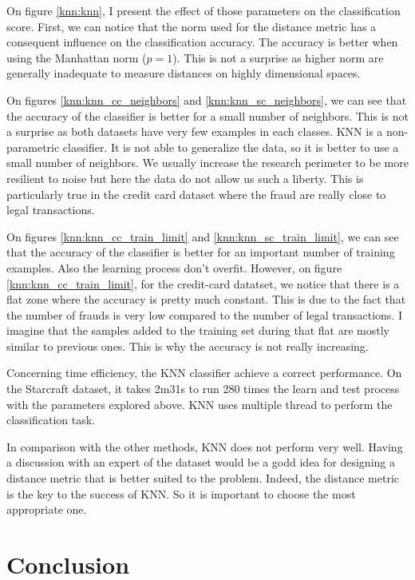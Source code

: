 \documentclass[10pt]{article}
\begin{document}
		On figure \ref{knn:knn}, I present the effect of those parameters on the classification score.
		First, we can notice that the norm used for the distance metric has a consequent influence on the classification accuracy. The accuracy is better when using the Manhattan norm ($p = 1$). This is not a surprise as higher norm are generally inadequate to measure distances on highly dimensional spaces.

		On figures \ref{knn:knn_cc_neighbors} and \ref{knn:knn_sc_neighbors}, we can see that the accuracy of the classifier is better for a small number of neighbors. This is not a surprise as both datasets have very few examples in each classes. KNN is a non-parametric classifier. It is not able to generalize the data, so it is better to use a small number of neighbors. We usually increase the research perimeter to be more resilient to noise but here the data do not allow us such a liberty. This is particularly true in the
		credit card dataset where the fraud are really close to legal transactions.

		On figures \ref{knn:knn_cc_train_limit} and \ref{knn:knn_sc_train_limit}, we can see that the accuracy of the classifier is better for an important number of training examples. Also the learning process don't overfit. However, on figure \ref{knn:knn_cc_train_limit}, for the credit-card datatset, we notice that there is a flat zone where the accuracy is pretty much constant. This is due to the fact that the number of frauds is very low compared to the number of legal transactions. I imagine that the samples added to the training set during that flat are mostly similar to previous ones. This is why the accuracy is not really increasing.

		Concerning time efficiency, the KNN classifier achieve a correct performance. On the Starcraft dataset, it takes 2m31s to run 280 times the learn and test process with the parameters explored above. KNN uses multiple thread to perform the classification task.

		In comparison with the other methods, KNN does not perform very well. Having a discussion with an expert of the dataset would be a godd idea for designing a distance metric that is better suited to the problem. Indeed, the distance metric is the key to the success of KNN. So it is important to choose the most appropriate one.
	\section{Conclusion}
\end{document}
